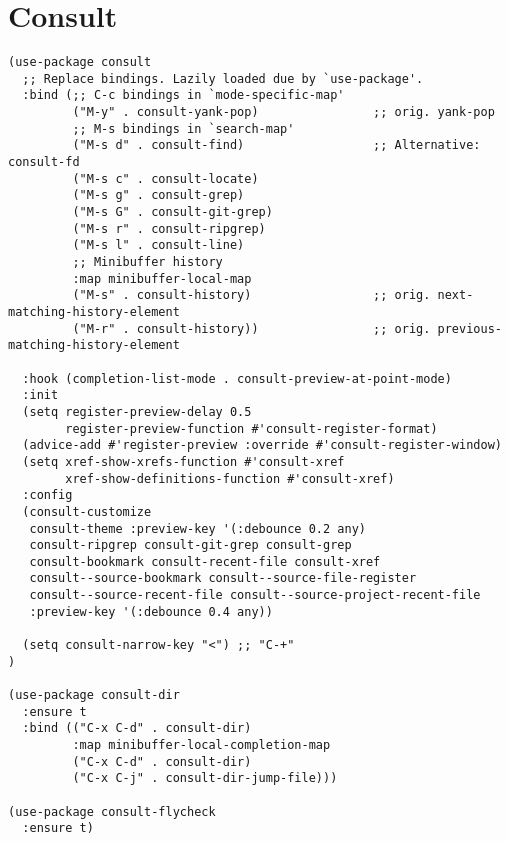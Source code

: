 \documentclass[11pt]{article}
\begin{document}
\section{Consult}
\label{sec:orgc828e90}
\begin{verbatim}
(use-package consult
  ;; Replace bindings. Lazily loaded due by `use-package'.
  :bind (;; C-c bindings in `mode-specific-map'
         ("M-y" . consult-yank-pop)                ;; orig. yank-pop
         ;; M-s bindings in `search-map'
         ("M-s d" . consult-find)                  ;; Alternative: consult-fd
         ("M-s c" . consult-locate)
         ("M-s g" . consult-grep)
         ("M-s G" . consult-git-grep)
         ("M-s r" . consult-ripgrep)
         ("M-s l" . consult-line)
         ;; Minibuffer history
         :map minibuffer-local-map
         ("M-s" . consult-history)                 ;; orig. next-matching-history-element
         ("M-r" . consult-history))                ;; orig. previous-matching-history-element

  :hook (completion-list-mode . consult-preview-at-point-mode)
  :init
  (setq register-preview-delay 0.5
        register-preview-function #'consult-register-format)
  (advice-add #'register-preview :override #'consult-register-window)
  (setq xref-show-xrefs-function #'consult-xref
        xref-show-definitions-function #'consult-xref)
  :config
  (consult-customize
   consult-theme :preview-key '(:debounce 0.2 any)
   consult-ripgrep consult-git-grep consult-grep
   consult-bookmark consult-recent-file consult-xref
   consult--source-bookmark consult--source-file-register
   consult--source-recent-file consult--source-project-recent-file
   :preview-key '(:debounce 0.4 any))

  (setq consult-narrow-key "<") ;; "C-+"
)

(use-package consult-dir
  :ensure t
  :bind (("C-x C-d" . consult-dir)
         :map minibuffer-local-completion-map
         ("C-x C-d" . consult-dir)
         ("C-x C-j" . consult-dir-jump-file)))

(use-package consult-flycheck
  :ensure t)
\end{verbatim}
\end{document}
